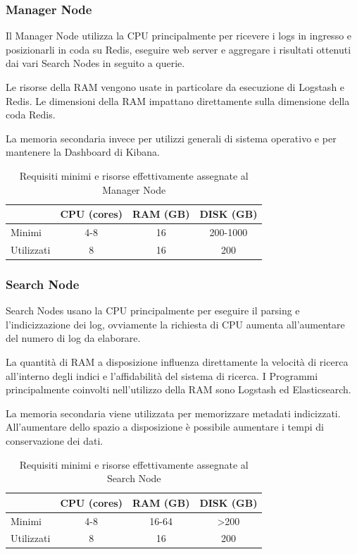 \subsubsection*{Manager Node}
Il Manager Node utilizza la CPU principalmente per ricevere i logs in ingresso e posizionarli in coda su Redis, eseguire web server e aggregare i risultati ottenuti dai vari Search Nodes in seguito a querie. 

Le risorse della RAM vengono usate in particolare da esecuzione di Logstash e Redis. Le dimensioni della RAM impattano direttamente sulla dimensione della coda Redis.

La memoria secondaria invece  per utilizzi generali di sistema operativo e per mantenere la Dashboard di Kibana.


\begin{table}[hbtp]
    \centering
    \begin{tabular}{|l|c|c|c|}
        \hline
        & CPU (cores) & RAM (GB) & DISK (GB) \\
        \hline
        Minimi     & 4-8 & 16 & 200-1000   \\
        \hline
        Utilizzati & 8   & 16  & 200 \\
        \hline
    \end{tabular}
    \caption{Requisiti minimi e risorse effettivamente assegnate al Manager Node}
    \label{tab:requisitiHw1}
\end{table}


\subsubsection*{Search Node}

Search Nodes usano la CPU principalmente per eseguire il parsing e l'indicizzazione dei log, ovviamente la richiesta di CPU aumenta all'aumentare del numero di log da elaborare.

La quantità di RAM a disposizione influenza direttamente la velocità di ricerca all'interno degli indici e l'affidabilità del sistema di ricerca. I Programmi principalmente coinvolti nell'utilizzo della RAM sono Logstash ed Elasticsearch.

La memoria secondaria viene utilizzata per memorizzare metadati indicizzati. All'aumentare dello spazio a disposizione è possibile aumentare i tempi di conservazione dei dati.

\begin{table}[hbtp]
    \centering
    \begin{tabular}{|l|c|c|c|}
        \hline
        & CPU (cores) & RAM (GB) & DISK (GB) \\
        \hline
        Minimi     & 4-8 & 16-64 & >200   \\
        \hline
        Utilizzati & 8   & 16  & 200 \\
        \hline
    \end{tabular}
    \caption{Requisiti minimi e risorse effettivamente assegnate al Search Node}
    \label{tab:requisitiHw2}
\end{table}



